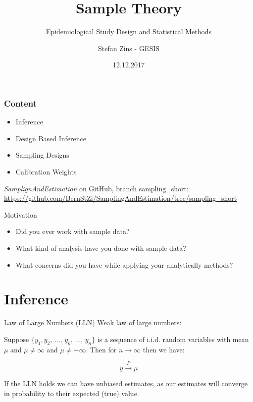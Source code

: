 \documentclass{beamer}\usepackage[]{graphicx}\usepackage[]{color}
\title{Sample Theory}
\subtitle{Epidemiological Study Design and Statistical Methods}
\author{Stefan Zins - GESIS}
\date{12.12.2017}
\begin{document}
\gesismaketitle %

\begin{frame}%
  \frametitle{Content}
  
  \begin{itemize}
  \item Inference
  \item Design Based Inference
  \item Sampling Designs
  \item Calibration Weights
  \end{itemize}


\emph{SamplignAndEstimation} on GitHub, branch sampling\_short:
\url{https://github.com/BernStZi/SamplingAndEstimation/tree/sampling_short}
\end{frame}


\begin{frame}{Motivation}
 \begin{itemize}
    \item<1,4> Did you ever work with sample data? 
    \item<2,4> What kind of analysis have you done with sample data?
    \item<3,4> What concerns did you have while applying your analytically methods?
  \end{itemize}
\end{frame}

\section{Inference}


\begin{frame}{Law of Large Numbers (LLN)}
Weak law of large numbers: 

Suppose $ \{ y_1{,}y_2{,}\,\ldots{,}\,y_k{,}\,\ldots{,}\,y_n \}$ is a sequence of i.i.d. random variables with mean $\mu$ and $\mu \neq \infty$ and $\mu \neq -\infty$. Then for $n \rightarrow \infty$ then we have:

$$
\bar{y} \xrightarrow{P} \mu
$$

If the LLN holds we can have unbiased estimates, as our estimates will converge in probability to their expected (true) value.
\end{frame}
\end{document}
